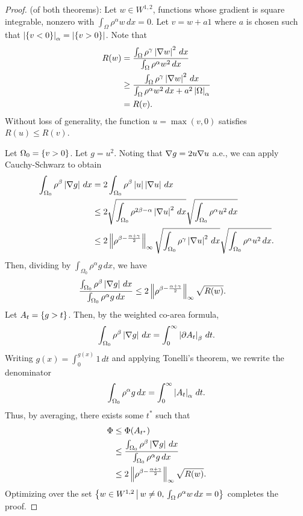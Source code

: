 \begin{proof} (of both theorems): 
Let $w\in W^{1,2}$, functions whose gradient is square integrable, nonzero with $\int_\Omega \rho^\alpha w\,dx = 0$. Let $v = w+a1$ where $a$ is chosen such that $\left| \left\{v<0\right\} \right|_\alpha = \left| \left\{v>0\right\} \right|$. Note that
\begin{align*}
R(w) &= \frac{\int_\Omega \rho^\gamma \left| \nabla w \right|^2\,dx}{\int_\Omega \rho^\alpha w^2\,dx}\\
&\geq \frac{\int_\Omega \rho^\gamma \left| \nabla w \right|^2\,dx}{\int_\Omega \rho^\alpha w^2\,dx+ a^2\left| \Omega \right|_\alpha}\\
&= R(v).
\end{align*}
Without loss of generality, the function $u = \max(v,0)$ satisfies $R(u)\leq R(v)$.

Let $\Omega_0 = \left\{v>0\right\}$. Let $g = u^2$. Noting that $\nabla g = 2u\nabla u$ a.e., we can apply Cauchy-Schwarz to obtain
\begin{align*}
\int_{\Omega_0}\rho^\beta \left| \nabla g \right|\,dx &= 2\int_{\Omega_0}\rho^\beta \left| u \right|\left| \nabla u \right|\,dx\\
&\leq 2 \sqrt{\int_{\Omega_0} \rho^{2\beta - \alpha} \left| \nabla u \right|^2\,dx}\sqrt{\int_{\Omega_0} \rho^{\alpha} u^2\,dx}\\
&\leq 2 \left\lVert \rho^{\beta - \frac{\alpha+\gamma}{2}} \right\rVert_\infty \sqrt{\int_{\Omega_0} \rho^\gamma \left| \nabla u \right|^2\,dx}\sqrt{\int_{\Omega_0} \rho^{\alpha} u^2\,dx}.
\end{align*}
Then, dividing by $\int_{\Omega_0} \rho^\alpha g\,dx$, we have
\begin{align*}
\frac{\int_{\Omega_0} \rho^\beta \left| \nabla g \right|\,dx}{\int_{\Omega_0} \rho^\alpha g\,dx} &\leq2 \left\lVert \rho^{\beta - \frac{\alpha+\gamma}{2}} \right\rVert_\infty \sqrt{R(w)}.
\end{align*}
Let $A_t = \left\{g>t\right\}$. Then, by the weighted co-area formula,
\begin{align*}
\int_{\Omega_0} \rho^\beta \left| \nabla g \right|\,dx = \int_0^\infty \left| \partial A_t \right|_\beta\,dt.
\end{align*}
Writing $g(x) = \int_0^{g(x)} 1 \,dt$ and applying Tonelli's theorem, we rewrite the denominator
\begin{align*}
\int_{\Omega_0} \rho^\alpha g\,dx = \int_{0}^\infty \left| A_t \right|_\alpha\,dt.
\end{align*}
Thus, by averaging, there exists some $t^*$ such that
\begin{align*}
\Phi &\leq \Phi(A_{t^*})\\
&\leq \frac{\int_{\Omega_0} \rho^\beta \left| \nabla g \right|\,dx}{\int_{\Omega_0} \rho^\alpha g\,dx}\\
&\leq2 \left\lVert \rho^{\beta - \frac{\alpha+\gamma}{2}} \right\rVert_\infty \sqrt{R(w)}.
\end{align*}
Optimizing over the set $\left\{w\in W^{1,2}\,\middle|\, w\neq 0,\,\int_\Omega \rho^\alpha w\,dx = 0\right\}$ completes the proof.
\end{proof}

